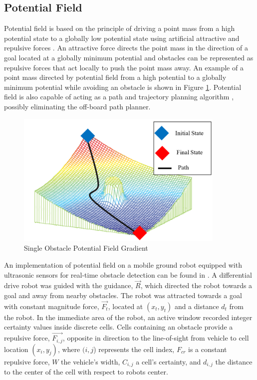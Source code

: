 \documentclass[numbered,pdftex]{ohio-etd}
\begin{document}
\subsection{Potential Field}

Potential field is based on the principle of driving a point mass from a high potential state to a globally low potential state using artificial attractive and repulsive forces \cite{khatib_real-time_1986}. An attractive force directs the point mass in the direction of a goal located at a globally minimum potential and obstacles can be represented as repulsive forces that act locally to push the point mass away. An example of a point mass directed by potential field from a high potential to a globally minimum potential while avoiding an obstacle is shown in Figure \ref{fig:pfobstacle}. Potential field is also capable of acting as a path and trajectory planning algorithm \cite{rimon_exact_1992}, possibly eliminating the off-board path planner. 

\begin{figure}[H]
	\centering
	\includegraphics[width=10cm]{PaperFigures/pfObstacle}
	\caption{Single Obstacle Potential Field Gradient \cite{liu_virtual-waypoint_2016}}
	\label{fig:pfobstacle}
\end{figure}


An implementation of potential field on a mobile ground robot equipped with ultrasonic sensors for real-time obstacle detection can be found in \cite{borenstein_real-time_1990,borenstein_vector_1991,koren_potential_1991}. A differential drive robot was guided  with the guidance, $\overrightarrow{R}$, which directed the robot towards a goal and away from nearby obstacles. The robot was attracted towards a goal with constant magnitude force, $\overrightarrow{F_t}$, located at $(x_t,y_t)$ and a distance $d_t$ from the robot. In the immediate area of the robot, an active window recorded integer certainty values inside discrete cells. Cells containing an obstacle provide a repulsive force, $\overrightarrow{F_{i,j}}$, opposite in direction to the line-of-sight from vehicle to cell location $(x_i,y_j)$, where $(i,j$) represents the cell index, $F_{cr}$ is a constant repulsive force, $W$ the vehicle's width, $C_{i,j}$ a cell's certainty, and $d_{i,j}$ the distance to the center of the cell with respect to robots center.
\end{document}

